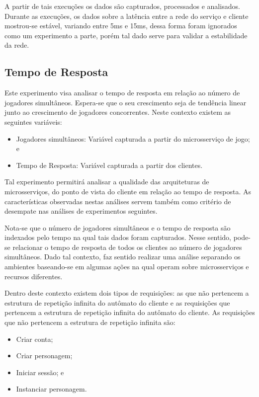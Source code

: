 A partir de tais execuções os dados são capturados, processados e analisados.
%
Durante as execuções, os dados sobre a latência entre a rede do serviço e cliente mostrou-se estável, variando entre 5ms e 15ms, dessa forma foram ignorados como um experimento a parte, porém tal dado serve para validar a estabilidade da rede.

\subsection{Tempo de Resposta}

Este experimento visa analisar o tempo de resposta em relação ao número de jogadores simultâneos.
%
Espera-se que o seu crescimento seja de tendência linear junto ao crescimento de jogadores concorrentes.
%
Neste contexto existem as seguintes variáveis:

\begin{itemize}
    \item Jogadores simultâneos: Variável capturada a partir do microsserviço de jogo; e
    \item Tempo de Resposta: Variável capturada a partir dos clientes.
\end{itemize}

Tal experimento permitirá analisar a qualidade das arquiteturas de microsserviços, do ponto de vista do cliente em relação ao tempo de resposta.
%
As características observadas nestas análises servem também como critério de desempate nas análises de experimentos seguintes.

Nota-se que o número de jogadores simultâneos e o tempo de resposta são indexados pelo tempo na qual tais dados foram capturados.
%
Nesse sentido, pode-se relacionar o tempo de resposta de todos os clientes ao número de jogadores simultâneos.
%
Dado tal contexto, faz sentido realizar uma análise separando os ambientes baseando-se em algumas ações na qual operam sobre microsserviços e recursos diferentes.

Dentro deste contexto existem dois tipos de requisições: as que não pertencem a estrutura de repetição infinita do autômato do cliente e as requisições que pertencem a estrutura de repetição infinita do autômato do cliente.
%
As requisições que não pertencem a estrutura de repetição infinita são:

\begin{itemize}
    \item Criar conta;
    \item Criar personagem;
    \item Iniciar sessão; e
    \item Instanciar personagem.
\end{itemize}

